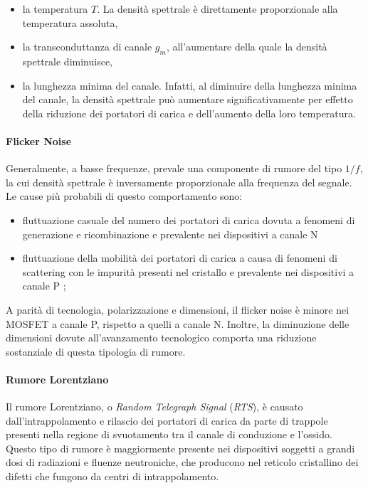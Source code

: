 \begin{itemize}
  \item la temperatura $T$. La densità spettrale è direttamente proporzionale alla temperatura assoluta,
  \item la transconduttanza di canale $g_m$, all'aumentare della quale la densità spettrale diminuisce,
  \item la lunghezza minima del canale. Infatti, al diminuire della lunghezza minima del canale, la densità spettrale può aumentare significativamente per effetto della riduzione dei portatori di carica e dell'aumento della loro temperatura.
\end{itemize}

\paragraph*{Flicker Noise}
Generalmente, a basse frequenze, prevale una componente di rumore del tipo $1/f$, la cui densità spettrale è inversamente proporzionale alla frequenza del segnale. Le cause più probabili di questo comportamento sono: 
\begin{itemize}
  \item fluttuazione casuale del numero dei portatori di carica dovuta a fenomeni di generazione e ricombinazione e prevalente nei dispositivi a canale N
  \item fluttuazione della mobilità dei portatori di carica a causa di fenomeni di scattering con le impurità presenti nel cristallo e prevalente nei dispositivi a canale P ;
\end{itemize}

A parità di tecnologia, polarizzazione e dimensioni, il flicker noise è minore nei MOSFET a canale P, rispetto a quelli a canale N. Inoltre, la diminuzione delle dimensioni dovute all'avanzamento tecnologico comporta una riduzione sostanziale di questa tipologia di rumore.

\paragraph*{Rumore Lorentziano}
Il rumore Lorentziano, o \emph{Random Telegraph Signal} (\emph{RTS}), è causato dall'intrappolamento e rilascio dei portatori di carica da parte di trappole presenti nella regione di svuotamento tra il canale di conduzione e l'ossido. Questo tipo di rumore è maggiormente presente nei dispositivi soggetti a grandi dosi di radiazioni e fluenze neutroniche, che producono nel reticolo cristallino dei difetti che fungono da centri di intrappolamento.

